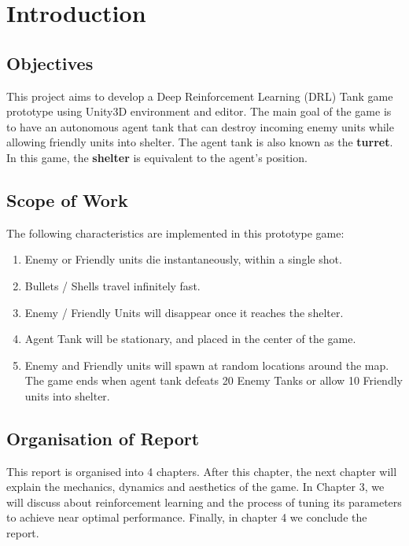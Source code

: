 
\chapter{Introduction}


\section{Objectives}

This project aims to develop a Deep Reinforcement Learning \cite{li2017deep} (DRL) Tank game prototype using Unity3D \cite{isik2018unityrl} environment and editor. The main goal of the game is to have an autonomous agent tank that can destroy incoming enemy units while allowing friendly units into shelter. The agent tank is also known as the \textbf{turret}. In this game, the \textbf{shelter} is equivalent to the agent's position. 

\section{Scope of Work}
The following characteristics are implemented in this prototype game:
\begin{enumerate}
    \item Enemy or Friendly units die instantaneously, within a single shot.
    \item Bullets / Shells travel infinitely fast.
    \item Enemy / Friendly Units will disappear once it reaches the shelter.
    \item Agent Tank will be stationary, and placed in the center of the game.
    \item Enemy and Friendly units will spawn at random locations around the map.
The game ends when agent tank defeats 20 Enemy Tanks or allow 10 Friendly units into shelter. 
\end{enumerate}


\section{Organisation of Report}

This report is organised into 4 chapters. After this chapter, the next chapter will explain the mechanics, dynamics and aesthetics of the game. In Chapter 3, we will discuss about reinforcement learning and the process of tuning its parameters to achieve near optimal performance. Finally, in chapter 4 we conclude the report.


